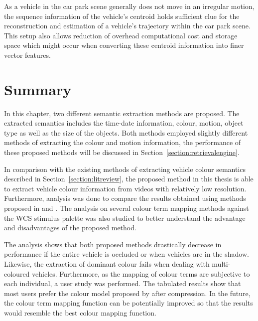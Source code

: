 As a vehicle in the car park scene generally does not move in an irregular motion, the sequence information of the vehicle's centroid holds sufficient clue for the reconstruction and estimation of a vehicle's trajectory within the car park scene. This setup also allows reduction of overhead computational cost and storage space which might occur when converting these centroid information into finer vector features.

\section{Summary}
In this chapter, two different semantic extraction methods are proposed. The extracted semantics includes the time-date information, colour, motion, object type as well as the size of the objects. Both methods employed slightly different methods of extracting the colour and motion information, the performance of these proposed methods will be discussed in Section~\ref{section:retrievalengine}.

In comparison with the existing methods of extracting vehicle colour semantics described in Section~\ref{section:litreview}, the proposed method in this thesis is able to extract vehicle colour information from videos with relatively low resolution.
Furthermore, analysis was done to compare the results obtained using methods proposed in \versionOneExt and \versionTwoExt. The analysis on several colour term mapping methods against the WCS stimulus palette was also studied to better understand the advantage and disadvantages of the proposed method.

The analysis shows that both proposed methods drastically decrease in performance if the entire vehicle is occluded or when vehicles are in the shadow. Likewise, the extraction of dominant colour fails when dealing with multi-coloured vehicles.
Furthermore, as the mapping of colour terms are subjective to each individual, a user study was performed. The tabulated results show that most users prefer the colour model proposed by  after compression.
In the future, the colour term mapping function can be potentially improved so that the results would resemble the best colour mapping function.

